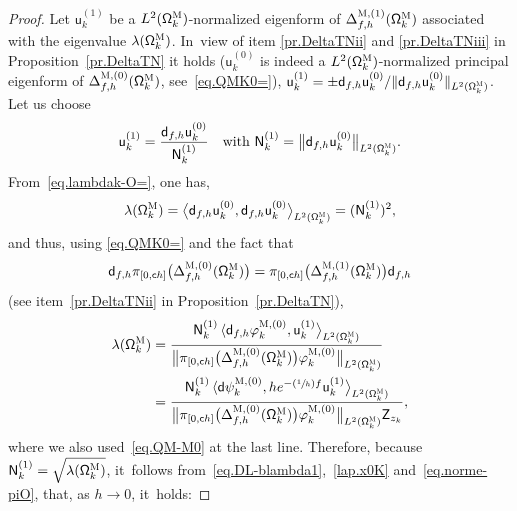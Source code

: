 \documentclass[JEP,XML,SOM,Unicode,NoEqCountersInSection,NoFloatCountersInSection,published]{cedram}
\newcommand{\Psfrac}[2]{(\sfrac{#1}{#2})}
\theoremstyle{plain}
\theoremstyle{definition}
\begin{document}
\begin{proof}
Let $\mathsf u^{(1)}_k$ be a $L^2(\mathsf
\Omega_k^{\textsc{M}})$-normalized eigenform of $
\Delta_{f,h}^{\textsc{M},(1)} (\mathsf \Omega_k^{\textsc{M}}) $
associated with the eigenvalue $\lambda(\mathsf
\Omega_k^{\textsc{M}})$. In~view of item \eqref{pr.DeltaTNii} and \eqref{pr.DeltaTNiii} in Proposition~\ref{pr.DeltaTN} it holds ($\mathsf u^{(0)}_k$ is indeed a
$L^2(\mathsf
\Omega_k^{\textsc{M}})$-normalized principal eigenform of $\Delta_{f,h}^{\textsc{M},(0)}
(\mathsf \Omega_k^{\textsc{M}})$, see~\eqref{eq.QMK0=}),
$\mathsf u^{(1)}_k=\pm \mathsf d_{f,h} \mathsf u^{(0)}_k / \Vert \mathsf d_{f,h} \mathsf u^{(0)}_k \Vert_{L^2(\mathsf \Omega_k^{\textsc{M}})}$.
Let us choose
\begin{equation}\label{eq.u1k}
\mathsf u^{(1)}_k=\frac{ \mathsf d_{f,h} \mathsf u^{(0)}_k } { \mathsf N_k^{(1)}} \quad\text{with } \mathsf N_k^{(1)}=\big \Vert \mathsf d_{f,h} \mathsf u^{(0)}_k\big \Vert_{L^2(\mathsf \Omega_k^{\textsc{M}})}.
\end{equation}
From~\eqref{eq.lambdak-O=}, one has,
\[
\lambda(\mathsf
\Omega_k^{\textsc{M}})= \bigl\langle \mathsf d_{f,h} \mathsf u^{(0)}_k, \mathsf d_{f,h} \mathsf u^{(0)}_k \big \rangle_{ L^2(\mathsf
\Omega_k^{\textsc{M}})}=(\mathsf N_k^{(1)})^2,
\]
and thus, using \eqref{eq.QMK0=} and the fact that
\[
\mathsf d_{f,h} \pi_{[0,\mathsf ch ]}\bigl(\Delta_{f,h}^{\textsc{M},(0)} (\mathsf \Omega_k^{\textsc{M}})\bigr)= \pi_{[0,\mathsf ch ]}\bigl(\Delta_{f,h}^{\textsc{M},(1)} (\mathsf \Omega_k^{\textsc{M}})\bigr) \mathsf d_{f,h}
\]
(see item~\eqref{pr.DeltaTNii} in Proposition~\ref{pr.DeltaTN}),
\begin{align*}
\lambda(\mathsf \Omega_k^{\textsc{M}})&=\frac{\mathsf N_k^{(1)} \,\langle \mathsf d_{f,h} \varphi^{\textsc{M},(0)}_k, \mathsf u^{(1)}_k \big \rangle_{ L^2(\mathsf \Omega_k^{\textsc{M}})}}{ \bigl\Vert\pi_{[0,\mathsf ch ]}\bigl(\Delta_{f,h}^{\textsc{M},(0)} (\mathsf \Omega_k^{\textsc{M}})\bigr) \varphi^{\textsc{M},(0)}_k \bigr\Vert_{L^2(\mathsf \Omega_k^{\textsc{M}})} } \\
&=\frac{\mathsf N_k^{(1)} \,\langle \mathsf d \psi^{\textsc{M},(0)}_k, h e^{-\Psfrac 1hf} \mathsf u^{(1)}_k \big \rangle_{ L^2(\mathsf \Omega_k^{\textsc{M}})}}{ \bigl\Vert\pi_{[0,\mathsf ch ]}\bigl(\Delta_{f,h}^{\textsc{M},(0)} (\mathsf \Omega_k^{\textsc{M}})\bigr) \varphi^{\textsc{M},(0)}_k \bigr\Vert_{L^2(\mathsf \Omega_k^{\textsc{M}})} \mathsf Z_{z_k} },
\end{align*}
where we also used~\eqref{eq.QM-M0} at the last line. Therefore, because $\mathsf N_k^{(1)}=\sqrt { \lambda(\mathsf \Omega_k^{\textsc{M}})}$, it~follows from~\eqref{eq.DL-blambda1},~\eqref{lap.x0K} and~\eqref{eq.norme-piO}, that, as $h\to 0$, it~holds:

\end{proof}
\end{document}
